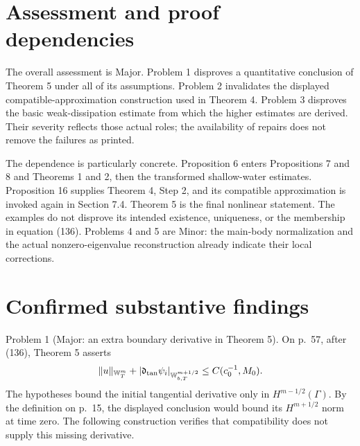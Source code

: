 \documentclass[10pt]{article}
\begin{document}
\section*{Assessment and proof dependencies}
The overall assessment is Major. Problem 1 disproves a quantitative conclusion of Theorem 5 under all of its assumptions. Problem 2 invalidates the displayed compatible-approximation construction used in Theorem 4. Problem 3 disproves the basic weak-dissipation estimate from which the higher estimates are derived. Their severity reflects those actual roles; the availability of repairs does not remove the failures as printed.\par
The dependence is particularly concrete. Proposition 6 enters Propositions 7 and 8 and Theorems 1 and 2, then the transformed shallow-water estimates. Proposition 16 supplies Theorem 4, Step 2, and its compatible approximation is invoked again in Section 7.4. Theorem 5 is the final nonlinear statement. The examples do not disprove its intended existence, uniqueness, or the membership in equation (136). Problems 4 and 5 are Minor: the main-body normalization and the actual nonzero-eigenvalue reconstruction already indicate their local corrections.\par
\section*{Confirmed substantive findings}
Problem 1 (Major: an extra boundary derivative in Theorem 5).  On p. 57, after (136), Theorem 5 asserts \[\|u\|_{\mathbb W_T^m}+|\mathfrak d_{\rm tan}\psi_i|_{\mathbb W_{b,T}^{m+1/2}}
 \le C(c_0^{-1},M_0).\] The hypotheses bound the initial tangential derivative only in \(H^{m-1/2}(\Gamma)\). By the definition on p. 15, the displayed conclusion would bound its \(H^{m+1/2}\) norm at time zero. The following construction verifies that compatibility does not supply this missing derivative.\par
\end{document}
